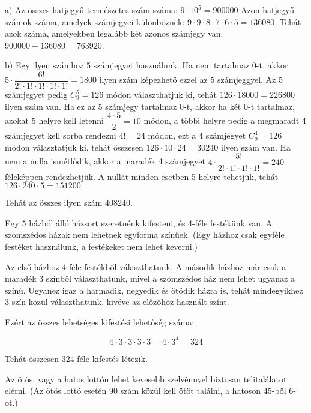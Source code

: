 \begin{solution}
a) Az összes hatjegyű természetes szám száma: $9\cdot10^{5}=900000$
Azon hatjegyű számok száma, amelyek számjegyei különböznek: $9\cdot9\cdot8\cdot7\cdot6\cdot5=136080$.
Tehát azok száma, amelyekben legalább két azonos számjegy van: $900000-136080=763920$.

b) Egy ilyen számhoz 5 számjegyet használunk. Ha nem tartalmaz 0-t,
akkor $5\cdot\dfrac{6!}{2!\cdot1!\cdot1!\cdot1!\cdot1!}=1800$ ilyen
szám képezhető ezzel az 5 számjeggyel. Az 5 számjegyet pedig $C_{9}^{5}=126$
módon választhatjuk ki, tehát $126\cdot18000=226800$ ilyen szám van.
Ha ez az 5 számjegy tartalmaz 0-t, akkor ha két 0-t tartalmaz, azokat
5 helyre kell letenni $\dfrac{4\cdot5}{2}=10$ módon, a többi helyre
pedig a megmaradt 4 számjegyet kell sorba rendezni $4!=24$ módon,
ezt a 4 számjegyet $C_{9}^{4}=126$ módon választatjuk ki, tehát összesen
$126\cdot10\cdot24=30240$ ilyen szám van. Ha nem a nulla ismétlődik,
akkor a maradék 4 számjegyet $4\cdot\dfrac{5!}{2!\cdot1!\cdot1!\cdot1!}=240$
féleképpen rendezhetjük. A nullát minden esetben 5 helyre tehetjük,
tehát $126\cdot240\cdot5=151200$

Tehát az összes ilyen szám 408240.
\end{solution}
\begin{extraproblem}
 Egy 5 házból álló házsort szeretnénk kifesteni, és 4-féle festékünk
van. A szomszédos házak nem lehetnek egyforma színűek. (Egy házhoz
csak egyféle festéket használunk, a festékeket nem lehet keverni.)
\end{extraproblem}

\begin{solution}
Az első házhoz 4-féle festékből választhatunk. A második házhoz már
csak a maradék 3 színből választhatunk, mivel a szomszédos ház nem
lehet ugyanaz a színű. Ugyanez igaz a harmadik, negyedik és ötödik
házra is, tehát mindegyikhez 3 szín közül választhatunk, kivéve az
előzőhöz használt színt.

Ezért az összes lehetséges kifestési lehetőség száma:

\[
4\cdot3\cdot3\cdot3\cdot3=4\cdot3^{4}=324
\]

Tehát összesen 324 féle kifestés létezik.
\end{solution}
\begin{extraproblem}
 Az ötös, vagy a hatos lottón lehet kevesebb szelvénnyel biztosan
telitalálatot elérni. (Az ötös lottó esetén 90 szám közül kell ötöt
találni, a hatoson 45-ből 6-ot.)
\end{extraproblem}

